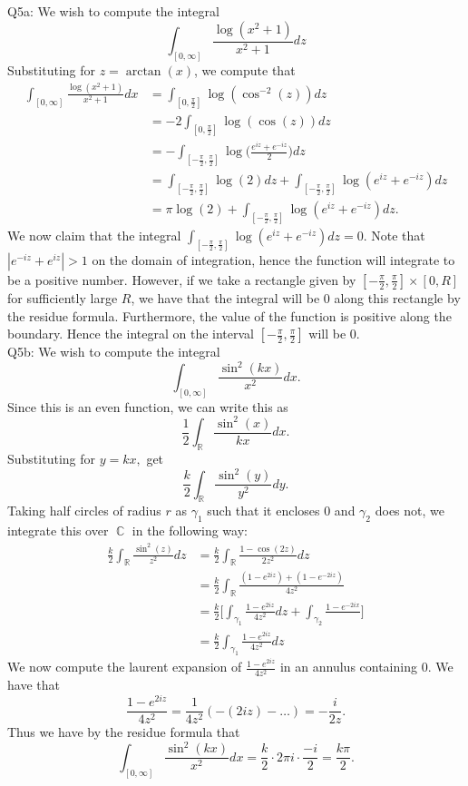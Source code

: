 \documentclass[letterpaper]{article}
\DeclareMathOperator{\R}{\mathbb{R}}
\DeclareMathOperator{\C}{\mathbb{C}}
\begin{document}
\noindent Q5a: We wish to compute the integral $$ \int_{[0, \infty]} \frac{\log(x^2+1)}{x^2+1}dz $$
Substituting for $z = \arctan(x)$, we compute that 
\begin{align*}
    \int_{[0, \infty]} \frac{\log(x^2+1)}{x^2+1}dx & = \int_{[0,\frac{\pi}{2}]} \log(\cos^{-2}(z)) dz \tag{by change of variables}
    \\ & = -2 \int_{[0, \frac{\pi}{2}]} \log(\cos(z))dz
    \\ & = - \int_{[-\frac{\pi}{2} , \frac{\pi}{2}]} \log \Big(\frac{e^{iz} + e^{-iz}}{2} \Big)dz
    \\ & = \int_{[-\frac{\pi}{2} , \frac{\pi}{2}]}\log(2) dz + \int_{[-\frac{\pi}{2} , \frac{\pi}{2}]} \log(e^{iz} + e^{-iz})dz
    \\ & = \pi \log(2) + \int_{[-\frac{\pi}{2} , \frac{\pi}{2}]} \log(e^{iz} + e^{-iz})dz. 
\end{align*}
We now claim that the integral $\int_{[-\frac{\pi}{2} , \frac{\pi}{2}]} \log(e^{iz} + e^{-iz})dz=0$. Note that $|e^{-iz} + e^{iz}|>1$ on the domain of integration, hence the function will integrate to be a positive number. However, if we take a rectangle given by $[-\frac{\pi}{2}, \frac{\pi}{2}]\times [0,R]$ for sufficiently large $R$, we have that the integral will be $0$ along this rectangle by the residue formula. Furthermore, the value of the function is positive along the boundary. Hence the integral on the interval $[-\frac{\pi}{2}, \frac{\pi}{2}]$ will be $0$. 
\newline \\ Q5b: We wish to compute the integral $$\int_{[0,\infty]} \frac{\sin^2(kx)}{x^2}dx. $$ Since this is an even function, we can write this as $$\frac{1}{2} \int_{\R} \frac{\sin^2(x)}{kx}dx.$$ 
Substituting for $y=kx,$ get $$\frac{k}{2} \int_{\R} \frac{\sin^2(y)}{y^2} dy.$$ 
Taking half circles of radius $r$ as $\gamma_1$ such that it encloses $0$ and $\gamma_2$ does not, we integrate this over $\C$ in the following way: 
\begin{align*}
    \frac{k}{2} \int_{\R} \frac{\sin^2(z)}{z^2} dz & = \frac{k}{2} \int_{\R} \frac{1-\cos(2z)}{2z^2}dz
    \\ & = \frac{k}{2} \int_{\R} \frac{(1-e^{2iz}) + (1-e^{-2iz})}{4z^2}
    \\ & = \frac{k}{2} \Big[ \int_{\gamma_1} \frac{1-e^{2iz}}{4z^2} dz + \int_{\gamma_2} \frac{1-e^{-2ix}}{}  \Big]
    \\ & = \frac{k}{2} \int_{\gamma_1} \frac{1-e^{2iz}}{4z^2} dz
\end{align*}
We now compute the laurent expansion of $\frac{1-e^{2iz}}{4z^2}$ in an annulus containing $0$. We have that $$\frac{1-e^{2iz}}{4z^2} = \frac{1}{4z^2}(-(2iz)- \dots) = -\frac{i}{2z}.$$
Thus we have by the residue formula that $$\int_{[0,\infty]} \frac{\sin^2(kx)}{x^2}dx = \frac{k}{2} \cdot 2\pi i \cdot \frac{-i}{2} = \frac{k\pi}{2}. $$
\end{document}
